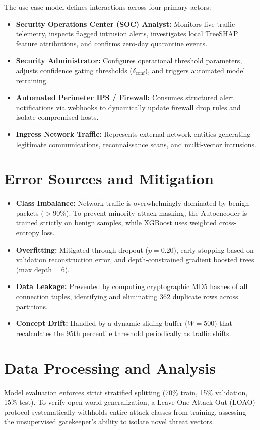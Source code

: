 \documentclass[12pt,a4paper]{report}
\begin{document}
The use case model defines interactions across four primary actors:
\begin{itemize}
    \item \textbf{Security Operations Center (SOC) Analyst:} Monitors live traffic telemetry, inspects flagged intrusion alerts, investigates local TreeSHAP feature attributions, and confirms zero-day quarantine events.
    \item \textbf{Security Administrator:} Configures operational threshold parameters, adjusts confidence gating thresholds ($\delta_{\text{conf}}$), and triggers automated model retraining.
    \item \textbf{Automated Perimeter IPS / Firewall:} Consumes structured alert notifications via webhooks to dynamically update firewall drop rules and isolate compromised hosts.
    \item \textbf{Ingress Network Traffic:} Represents external network entities generating legitimate communications, reconnaissance scans, and multi-vector intrusions.
\end{itemize}

\section{Error Sources and Mitigation}
\begin{itemize}
    \item \textbf{Class Imbalance:} Network traffic is overwhelmingly dominated by benign packets ($>90\%$). To prevent minority attack masking, the Autoencoder is trained strictly on benign samples, while XGBoost uses weighted cross-entropy loss.
    \item \textbf{Overfitting:} Mitigated through dropout ($p=0.20$), early stopping based on validation reconstruction error, and depth-constrained gradient boosted trees ($\text{max\_depth} = 6$).
    \item \textbf{Data Leakage:} Prevented by computing cryptographic MD5 hashes of all connection tuples, identifying and eliminating 362 duplicate rows across partitions.
    \item \textbf{Concept Drift:} Handled by a dynamic sliding buffer ($W=500$) that recalculates the 95th percentile threshold periodically as traffic shifts.
\end{itemize}

\section{Data Processing and Analysis}
Model evaluation enforces strict stratified splitting (70\% train, 15\% validation, 15\% test). To verify open-world generalization, a Leave-One-Attack-Out (LOAO) protocol systematically withholds entire attack classes from training, assessing the unsupervised gatekeeper's ability to isolate novel threat vectors.
\end{document}
